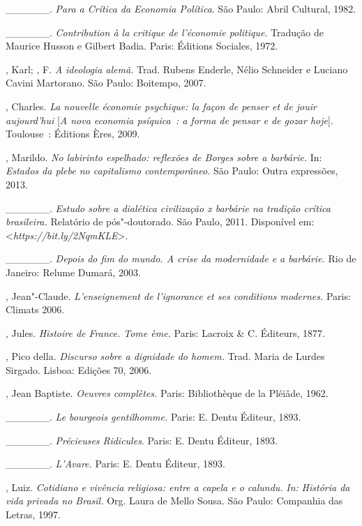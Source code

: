 \begin{Parskip}
\_\_\_\_\_\_. \emph{Para a Crítica da Economia Política}. São Paulo:
Abril Cultural, 1982.

\_\_\_\_\_\_. \emph{Contribution à la critique de l'économie
politique}. Tradução de Maurice Husson e Gilbert Badia. Paris: Éditions
Sociales, 1972.

, Karl; , F. \emph{A ideologia alemã.} Trad. Rubens Enderle,
Nélio Schneider e Luciano Cavini Martorano. São Paulo: Boitempo, 2007.

, Charles. \emph{La nouvelle économie psychique: la façon de
penser et de jouir aujourd'hui} [\emph{A nova economia psíquica~: a
forma de pensar e de gozar hoje}]. Toulouse~: Éditions Ères, 2009.

, Marildo. \emph{No labirinto espelhado: reflexões de Borges
sobre a barbárie.} In: \emph{Estados da plebe no capitalismo
contemporâneo.} São Paulo: Outra expressões, 2013.

\_\_\_\_\_\_. \emph{Estudo sobre a dialética civilização x barbárie na
tradição crítica brasileira.} Relatório de pós"-doutorado. São Paulo,
2011. Disponível em: \textless{}\emph{https://bit.ly/2NqmKLE}\textgreater{}.

\_\_\_\_\_\_. \emph{Depois do fim do mundo. A crise da modernidade e a
barbárie.} Rio de Janeiro: Relume Dumará, 2003.

, Jean"-Claude. \emph{L'enseignement de l'ignorance et ses
conditions modernes.} Paris: Climats 2006.

, Jules. \emph{Histoire de France. Tome ème.} Paris: Lacroix
\& C. Éditeurs, 1877.

, Pico della. \emph{Discurso sobre a dignidade do homem.}
Trad. Maria de Lurdes Sirgado. Lisboa: Edições 70, 2006.

, Jean Baptiste. \emph{Oeuvres complètes.} Paris: Bibliothèque
de la Pléiâde, 1962.

\_\_\_\_\_\_. \emph{Le bourgeois gentilhomme.} Paris: E. Dentu
Éditeur, 1893.

\_\_\_\_\_\_. \emph{Précieuses Ridicules}. Paris: E. Dentu Éditeur,
1893.

\_\_\_\_\_\_. \emph{L'Avare.} Paris: E. Dentu Éditeur, 1893.

, Luiz. \emph{Cotidiano e vivência religiosa: entre a capela e o
calundu.} \emph{In:} \emph{História da vida privada no Brasil.} Org.
Laura de Mello Sousa. São Paulo: Companhia das Letras, 1997.


\end{Parskip}
